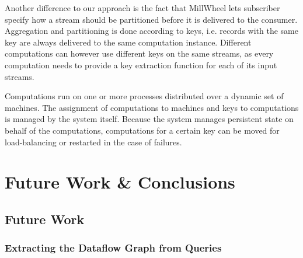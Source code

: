 Another difference to our approach is the fact that MillWheel lets subscriber
specify how a stream should be partitioned before it is delivered to the consumer.
Aggregation and partitioning is done according to keys, i.e. records with the
same key are always delivered to the same computation instance. Different
computations can however use different keys on the same streams, as every computation
needs to provide a key extraction function for each of its input streams.

Computations run on one or more processes distributed over a dynamic set of
machines. The assignment of computations to machines and keys to computations
is managed by the system itself. Because the system manages persistent state
on behalf of the computations, computations for a certain key can be moved
for load-balancing or restarted in the case of failures.

\cleardoublepage
\chapter{Future Work \& Conclusions} \label{ch:future}

\section{Future Work}

\subsection{Extracting the Dataflow Graph from Queries}

